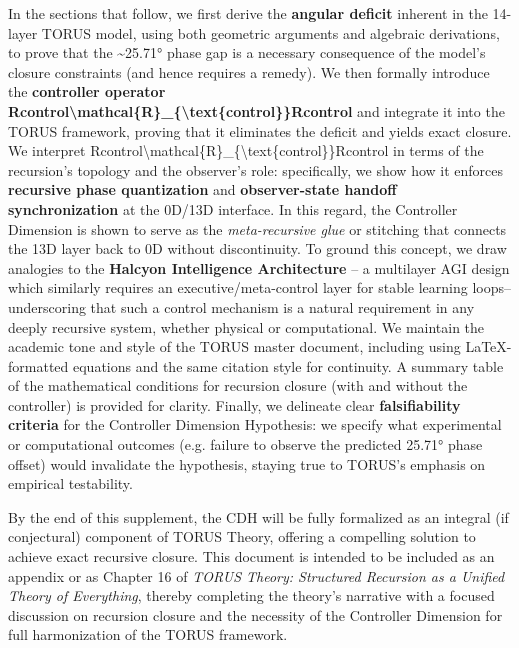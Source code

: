 \documentclass[]{article}
\begin{document}
In the sections that follow, we first derive the \textbf{angular
deficit} inherent in the 14-layer TORUS model, using both geometric
arguments and algebraic derivations, to prove that the
\textasciitilde{}25.71° phase gap is a necessary consequence of the
model's closure constraints (and hence requires a remedy). We then
formally introduce the \textbf{controller operator
Rcontrol\textbackslash{}mathcal\{R\}\_\{\textbackslash{}text\{control\}\}Rcontrol​}
and integrate it into the TORUS framework, proving that it eliminates
the deficit and yields exact closure. We interpret
Rcontrol\textbackslash{}mathcal\{R\}\_\{\textbackslash{}text\{control\}\}Rcontrol​
in terms of the recursion's topology and the observer's role:
specifically, we show how it enforces \textbf{recursive phase
quantization} and \textbf{observer-state handoff synchronization} at the
0D/13D interface. In this regard, the Controller Dimension is shown to
serve as the \emph{meta-recursive glue} or stitching that connects the
13D layer back to 0D without discontinuity. To ground this concept, we
draw analogies to the \textbf{Halcyon Intelligence Architecture} -- a
multilayer AGI design which similarly requires an executive/meta-control
layer for stable learning loops​-- underscoring that such a control
mechanism is a natural requirement in any deeply recursive system,
whether physical or computational. We maintain the academic tone and
style of the TORUS master document, including using LaTeX-formatted
equations and the same citation style for continuity. A summary table of
the mathematical conditions for recursion closure (with and without the
controller) is provided for clarity. Finally, we delineate clear
\textbf{falsifiability criteria} for the Controller Dimension
Hypothesis: we specify what experimental or computational outcomes (e.g.
failure to observe the predicted 25.71° phase offset) would invalidate
the hypothesis, staying true to TORUS's emphasis on empirical
testability​.

By the end of this supplement, the CDH will be fully formalized as an
integral (if conjectural) component of TORUS Theory, offering a
compelling solution to achieve exact recursive closure. This document is
intended to be included as an appendix or as Chapter 16 of \emph{TORUS
Theory: Structured Recursion as a Unified Theory of Everything}, thereby
completing the theory's narrative with a focused discussion on recursion
closure and the necessity of the Controller Dimension for full
harmonization of the TORUS framework.
\end{document}
